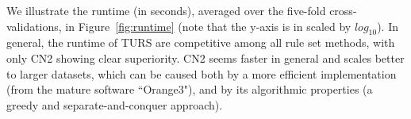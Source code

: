 We illustrate the runtime (in seconds), averaged over the five-fold cross-validations, in Figure~\ref{fig:runtime} (note that the y-axis is in scaled by $log_{10}$). In general, the runtime of TURS are competitive among all rule set methods, with only CN2 showing clear superiority. CN2 seems faster in general and scales better to larger datasets, which can be caused both by a more efficient implementation (from the mature software ``Orange3"), and by its algorithmic properties (a greedy and separate-and-conquer approach). 














